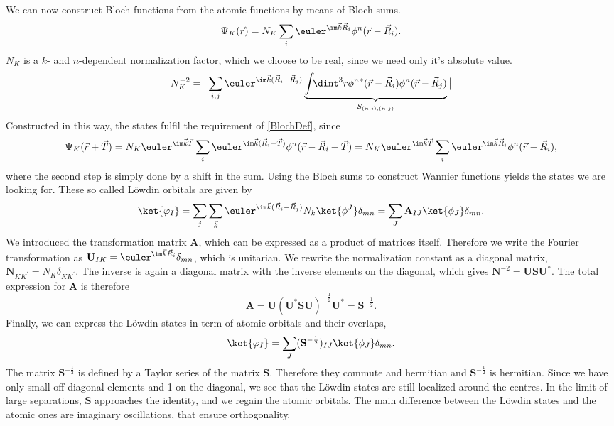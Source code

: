 We can now construct Bloch functions from the atomic functions by means of Bloch sums.
\begin{equation}
  \Psi_K(\vec{r}) = N_K \sum_{i} \euler^{\im \vec{k}\vec{R}_i }  \phi^n(\vec{r}-\vec{R}_i). 
\end{equation}
$N_K$ is a $k$- and $n$-dependent normalization factor, which we choose to be real, since we need only it's absolute value.
\begin{equation}
 N_K^{-2}  = \big| \sum_{i,j} \euler^{\im \vec k (\vec R_i-\vec R_j)}  
 \underbrace{\int \!\! \dint^3 r {\phi^n}^*(\vec r - \vec R_i) \phi^n(\vec r- \vec R_j)}_{S_{(n,i),(n,j)}} \big|
\end{equation}
Constructed in this way, the states fulfil the requirement of \ref{BlochDef}, since
\begin{equation}
 \Psi_{K}(\vec{r}+\vec{T}) 
 = N_{K} \euler^{\im \vec{k} \vec{T} } \sum_{i} \euler^{\im \vec{k} (\vec{R}_i-\vec{T})} \phi^n (\vec{r}-\vec{R}_i+\vec{T}) 
 = N_{K} \euler^{\im \vec{k} \vec{T} } \sum_{i} \euler^{\im \vec{k}\vec{R}_i }  \phi^{n}(\vec{r}-\vec{R}_i), 
\end{equation}
where the second step is simply done by a shift in the sum. 
Using the Bloch sums to construct Wannier functions yields the states we are looking for.
These so called Löwdin orbitals are given by
\begin{equation}
 \ket{\varphi_I} = \sum_{j}  \sum_{\vec k} \euler^{\im \vec k ( \vec R_i - \vec R_j ) } N_k \ket{\phi^J}\delta_{mn} = \sum_{J} \mathbf A_{IJ}\ket{\phi_J}\delta_{mn} .
\end{equation}
We introduced the transformation matrix $\mathbf A$, which can be expressed as a product of matrices itself.
Therefore we write the Fourier transformation as 
$\mathbf U_{IK} = \euler^{\im \vec k \vec R_i}\delta_{mn}$, which is unitarian. 
We rewrite the normalization constant as a diagonal matrix, $\mathbf N_{KK^{\prime}}= N_{K} \delta_{KK^{\prime}}$. 
The inverse is again a diagonal matrix with the inverse elements on the diagonal, which gives
$\mathbf N^{-2} = \mathbf U \mathbf S \mathbf U^*$.
The total expression for $\mathbf A$ is therefore
\begin{equation}
 \mathbf A = \mathbf U(\mathbf U^*\mathbf S\mathbf U)^{-\frac12}\mathbf U^* = \mathbf S^{-\frac12}.
\end{equation}
Finally, we can express the Löwdin states in term of atomic orbitals and their overlaps,
\begin{equation}
 \ket{\varphi_I} = \sum_J (\mathbf S^{-\frac12})_{IJ} \ket{\phi_J}\delta_{mn}.
\end{equation}
The matrix $\mathbf S^{-\frac12}$ is defined by a Taylor series of the matrix $\mathbf S$. 
Therefore they commute and hermitian and $\mathbf S^{-\frac12}$ is hermitian.
Since we have only small off-diagonal elements and 1 on the diagonal, we see that the Löwdin states are still
localized around the centres. 
In the limit of large separations, $\mathbf S$ approaches the identity, and we regain the atomic orbitals.
The main difference between the Löwdin states and the atomic ones are imaginary oscillations, that ensure orthogonality.


